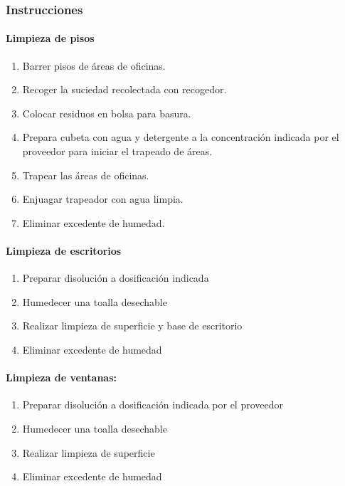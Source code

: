 \subsubsection{Instrucciones}

\paragraph{Limpieza de pisos}

\begin{enumerate}
	\item Barrer pisos de áreas de oficinas.
	\item Recoger la suciedad recolectada con recogedor.
	\item Colocar residuos en bolsa para basura.
	\item Prepara cubeta con agua y detergente a la concentración indicada por el proveedor para iniciar el trapeado de áreas.
	\item Trapear las áreas de oficinas.
	\item Enjuagar trapeador con agua limpia.
	\item Eliminar excedente de humedad.
\end{enumerate}

\paragraph{Limpieza de escritorios}

\begin{enumerate}
	\item Preparar disolución a dosificación indicada
	\item Humedecer una toalla desechable
	\item Realizar limpieza de superficie y base de escritorio
	\item Eliminar excedente de humedad
\end{enumerate}

\paragraph{Limpieza de ventanas:}

\begin{enumerate}
	\item Preparar disolución a dosificación indicada por el proveedor
	\item Humedecer una toalla desechable
	\item Realizar limpieza de superficie
	\item Eliminar excedente de humedad
\end{enumerate}

